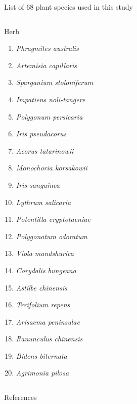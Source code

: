 \begin{frame}[shrink]{List of 68 plant species used in this study}
\begin{columns}[T,onlytextwidth]
	\begin{exampleblock}{Herb}		
		\begin{enumerate}			
			\item \emph{Phragmites australis} \item \emph{Artemisia capillaris} \item \emph{Sparganium stoloniferum}
			\item \emph{Impatiens noli-tangere} \item \emph{Polygonum persicaria} \item \emph{Iris pseudacorus}
			\item \emph{Acorus tatarinowii} \item \emph{Monochoria korsakowii} \item \emph{Iris sanguinea}
			\item \emph{Lythrum salicaria}
			\item \emph{Potentilla cryptotaeniae}	\item \emph{Polygonatum odoratum} \item \emph{Viola mandshurica}
			\item \emph{Corydalis bungeana}	\item \emph{Astilbe chinensis} \item \emph{Trrifolium repens}
			\item \emph{Arisaema peninsulae}	\item \emph{Ranunculus chinensis} \item \emph{Bidens biternata}
			\item \emph{Agrimonia pilosa}
		\end{enumerate}	
	\end{exampleblock}	
\end{columns}

\end{frame}

\begin{frame}[t,allowframebreaks]{References}
  
  
\end{frame}